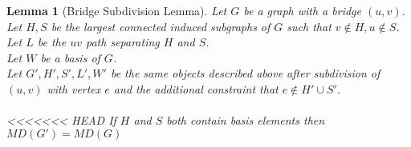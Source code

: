 \documentclass[11pt]{amsart}
\theoremstyle{plain}  %
\newtheorem{lem}[thm]{Lemma}
\theoremstyle{definition}
\theoremstyle{remark}
\numberwithin{equation}{thm}
\begin{document}
\begin{lem}[Bridge Subdivision Lemma]
 Let $G$ be a graph with a bridge $(u,v)$.\\
 Let $H, S$ be the largest connected induced subgraphs of $G$ such that $v\notin H, u\notin S$.\\
 Let $L$ be the $uv$ path separating $H$ and $S$.\\
 Let $W$ be a basis of $G$.\\
 Let $G', H', S', L', W'$ be the same objects described above after subdivision of $(u,v)$ with vertex $e$ and the additional constraint that
 $e \notin H' \cup S'$.\\
 \\
<<<<<<< HEAD
 If $H$ and $S$ both contain basis elements then $MD(G') = MD(G)$
\end{lem}
\end{document}
